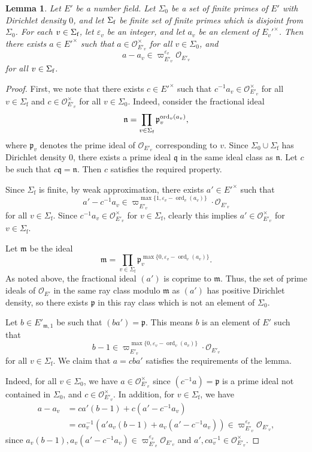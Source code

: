 \documentclass[11pt, reqno]{amsart}
\numberwithin{equation}{subsection}
\theoremstyle{plain}
\newtheorem{lem}[proposition]{Lemma}
\theoremstyle{definition}
\newcommand{\fm}{\mathfrak m}
\newcommand{\fp}{\mathfrak p}
\renewcommand{\O}{\mathcal O}
\DeclareMathOperator{\ord}{ord}
\begin{document}
\begin{lem}
\label{lem:aapprox}
Let $E'$ be a number field. Let $\Sigma_0$
be a set of finite primes of $E'$ with Dirichlet density
$0$, and let $\Sigma_{\textnormal{f}}$ be finite set of finite primes
which is disjoint from $\Sigma_0$.
For each $v \in \Sigma_{\textnormal f}$, let $\varepsilon_v$ 
be an integer, and let $a_v$ be an element of 
$E_v'^\times$.
Then there exists $a \in E'^\times$
such that $a \in \O_{E'_v}^\times$ for all $v \in \Sigma_0$, and
\[
    a - a_v \in \varpi_{E'_v}^{\varepsilon_v} \O_{E'_v}
\]
for all $v \in \Sigma_{\textnormal{f}}$.
\end{lem}
\begin{proof}
First, we note that there exists $c \in E'^\times$ 
such that $c^{-1} a_v\in \O_{E'_v}^\times$ for all 
$v \in \Sigma_{\text{f}}$ and $c \in \O_{E'_v}^\times$ 
for all $v \in \Sigma_0$. Indeed, consider the 
fractional ideal
\[
    \mathfrak n = \prod_{v \in \Sigma_{\textnormal{f}}} \mathfrak p_v^{\ord_v(a_v)},
\]
where $\fp_v$ denotes the prime ideal of $\O_{E'_v}$
corresponding to $v$. Since $\Sigma_0 \cup \Sigma_{\text{f}}$ 
has Dirichlet density $0$, there exists a prime ideal
$\mathfrak q$ in the same ideal class as $\mathfrak n$.
Let $c$ be such that $c \mathfrak q = \mathfrak n$.
Then $c$ satisfies the required property.

Since $\Sigma_{\text{f}}$ is finite, by weak
approximation, there exists $a' \in E'^\times$ such that
\[  
    a' - c^{-1} a_v \in \varpi_{E'_v}^{\max\{1,
    \varepsilon_v - \ord_v(a_v)\}} \cdot \O_{E'_v}
\]
for all $v \in \Sigma_{\text{f}}$.
Since $c^{-1} a_v \in \O_{E'_v}^\times$ for
$v \in \Sigma_{\text{f}}$,
clearly this implies $a' \in \O_{E'_v}^\times$
for $v \in \Sigma_{\text{f}}$. 

Let $\fm$ be the ideal
\[
    \fm = \prod_{v \in \Sigma_{\text{f}}} 
    \fp_v^{\max\{0,
    \varepsilon_v - \ord_v(a_v)\}}.
\]
As noted above, the fractional ideal
$(a')$ is coprime to $\fm$. Thus, the set of prime
ideals of $\O_{E'}$ in the same ray class
modulo $\fm$ as $(a')$ has positive Dirichlet density,
so there exists $\fp$ in this ray class
which is not an element of $\Sigma_0$.

Let $b \in E'_{\fm, 1}$ be such that $(ba') = \fp$.
This means $b$ is an element of $E'$ such that
\[
    b - 1 \in \varpi_{E'_v}^{\max\{0,
    \varepsilon_v - \ord_v(a_v)\}} \cdot \O_{E'_v}
\]
for all $v \in \Sigma_{\text{f}}$. 
We claim that $a = cba'$
satisfies the requirements of the lemma.

Indeed, for all $v \in \Sigma_0$,
we have $a \in \O_{E'_v}^\times$ since 
$(c^{-1} a) = \fp$ is a prime ideal not contained in $\Sigma_0$, and $c \in \O_{E'_v}^\times$.
In addition, for $v \in \Sigma_{\text{f}}$, we have
\begin{align*}
    a - a_v &= ca'(b - 1) + c(a' - c^{-1}a_v) \\
    &= ca_v^{-1}(a'a_v(b - 1) + a_v(a' - c^{-1}a_v))
    \in
    \varpi_{E'_v}^{\varepsilon_v} \O_{E'_v},
\end{align*}
since $a_v(b - 1), a_v(a' - c^{-1}a_v) \in 
\varpi_{E'_v}^{\varepsilon_v} \O_{E'_v}$ and 
$a', ca_v^{-1} \in \O_{E'_v}^\times$.
\end{proof}
\end{document}
